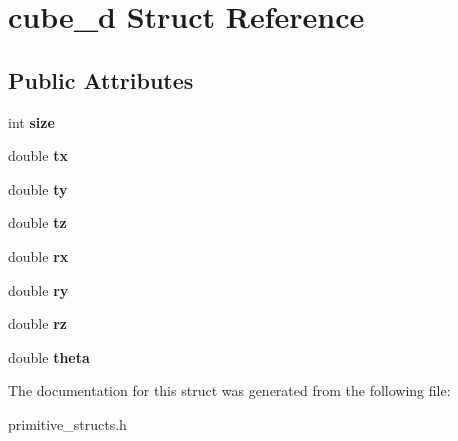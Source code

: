 \hypertarget{structcube__d}{}\section{cube\+\_\+d Struct Reference}
\label{structcube__d}
\subsection*{Public Attributes}
\begin{DoxyCompactItemize}
\item 
int {\bfseries size}\hypertarget{structcube__d_a5b07a8023315c0c07d47896a35f93fe5}{}\label{structcube__d_a5b07a8023315c0c07d47896a35f93fe5}

\item 
double {\bfseries tx}\hypertarget{structcube__d_a13791b2d4217a13093212c45abacdd57}{}\label{structcube__d_a13791b2d4217a13093212c45abacdd57}

\item 
double {\bfseries ty}\hypertarget{structcube__d_aada396b255e95d0c7f203c29d98673c1}{}\label{structcube__d_aada396b255e95d0c7f203c29d98673c1}

\item 
double {\bfseries tz}\hypertarget{structcube__d_a0cd4e83f8af0bd23a6c1a24b0519746d}{}\label{structcube__d_a0cd4e83f8af0bd23a6c1a24b0519746d}

\item 
double {\bfseries rx}\hypertarget{structcube__d_afec1a593c949e74539635bef1c616ca6}{}\label{structcube__d_afec1a593c949e74539635bef1c616ca6}

\item 
double {\bfseries ry}\hypertarget{structcube__d_af2538f7a65b43dd5f09b64a96cd0b00f}{}\label{structcube__d_af2538f7a65b43dd5f09b64a96cd0b00f}

\item 
double {\bfseries rz}\hypertarget{structcube__d_a484fb45b4bbab9fb0df619ef6755a1f1}{}\label{structcube__d_a484fb45b4bbab9fb0df619ef6755a1f1}

\item 
double {\bfseries theta}\hypertarget{structcube__d_addee312eac554c979d6b7191185ee478}{}\label{structcube__d_addee312eac554c979d6b7191185ee478}

\end{DoxyCompactItemize}


The documentation for this struct was generated from the following file\+:\begin{DoxyCompactItemize}
\item 
primitive\+\_\+structs.\+h\end{DoxyCompactItemize}
